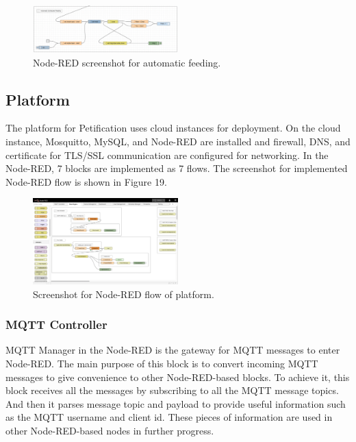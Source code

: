 \documentclass[conference]{IEEEtran}
\begin{document}
\begin{figure}[htbp]
\centerline{\includegraphics[width=0.5\textwidth]{./images/automaticFeeding.png}}
\caption{Node-RED screenshot for automatic feeding.}
\label{fig}
\end{figure}

\subsection{Platform}
The platform for Petification uses cloud instances for deployment. On the cloud instance, Mosquitto, MySQL, and Node-RED are installed and firewall, DNS, and certificate for TLS/SSL communication are configured for networking. In the Node-RED, 7 blocks are implemented as 7 flows. The screenshot for implemented Node-RED flow is shown in Figure 19.

\begin{figure}[htbp]
\centerline{\includegraphics[width=0.5\textwidth]{./images/platformImpl.png}}
\caption{Screenshot for Node-RED flow of platform.}
\label{fig}
\end{figure}

\subsubsection{MQTT Controller}
\hfill \break MQTT Manager in the Node-RED is the gateway for MQTT messages to enter Node-RED. The main purpose of this block is to convert incoming MQTT messages to give convenience to other Node-RED-based blocks. To achieve it, this block receives all the messages by subscribing to all the MQTT message topics. And then it parses message topic and payload to provide useful information such as the MQTT username and client id. These pieces of information are used in other Node-RED-based nodes in further progress.
\end{document}
